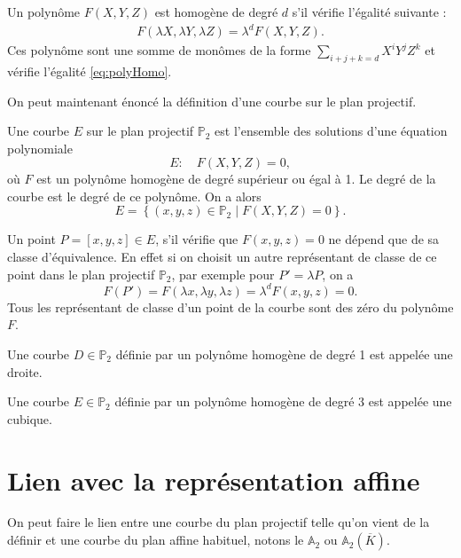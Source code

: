 \begin{definition}
    \label{polyHomo}
    
    Un polynôme $F(X,Y,Z)$ est homogène de degré $d$ s'il vérifie l'égalité suivante :
    \begin{align}
        \label{eq:polyHomo}
    F(\lambda X, \lambda Y, \lambda Z) = \lambda^{d}F(X,Y,Z)
    .\end{align}
    Ces polynôme sont une somme de monômes de la forme $\sum_{i+j+k=d} X^{i}Y^{j}Z^{k}$
    et vérifie l'égalité \eqref{eq:polyHomo}.
\end{definition}

On peut maintenant énoncé la définition d'une courbe sur le plan projectif.

\begin{definition}
    \label{def:courbeP2}
    Une courbe $E$ sur le plan projectif $\mathbb{P}_{2}$ est l'ensemble des solutions d'une
    équation polynomiale 
    \[
    E : \quad F(X,Y,Z)=0
    ,\] 
    où $F$ est un polynôme homogène de degré supérieur ou égal à 1. Le degré de la courbe
    est le degré de ce polynôme. On a alors 
    \[
    E = \left\{ (x,y,z) \in \mathbb{P}_{2} \mid F(X,Y,Z)=0 \right\} 
    .\] 
\end{definition}


Un point $P = [x,y,z] \in E$, s'il vérifie que $F(x,y,z)=0$ ne dépend que de sa classe
d'équivalence. En effet si on choisit un autre
représentant de classe de ce point dans le plan projectif $\mathbb{P}_{2}$, par exemple pour
$P'=\lambda P$, on a
\[
F(P')=F(\lambda x, \lambda y, \lambda z) = \lambda^{d}F(x,y,z) = 0
.\] 
Tous les représentant de classe d'un point de la courbe sont des zéro du polynôme $F$.

\begin{definition}
    \label{def:cubique}
    
    Une courbe $D \in \mathbb{P}_{2}$ définie par un polynôme homogène de degré 1 est appelée
    une droite.

    Une courbe $E \in \mathbb{P}_{2}$ définie par un polynôme homogène de degré $3$ est appelée
    une cubique.
\end{definition}

\section{Lien avec la représentation affine}
On peut faire le lien entre une courbe du plan projectif telle qu'on vient de la définir
et une courbe du plan affine habituel, notons le $\mathbb{A}_{2}$ ou
$\mathbb{A}_{2}(\overline{K})$. 

